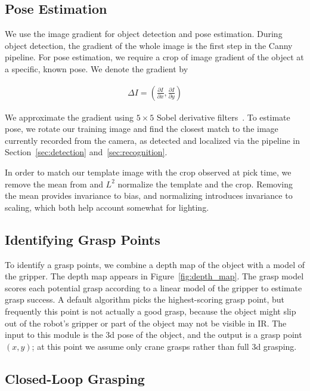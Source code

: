 \documentclass{article}
\begin{document}
 
\subsection{Pose Estimation}

We use the image gradient for object detection and pose estimation. During
object detection, the gradient of the whole image is the first step in the Canny pipeline.
For pose estimation,  we require a crop of  image gradient of the object
at a specific, known pose. We denote the gradient by

\begin{align}
\Delta I = \left( \frac{\partial I}{\partial x}, \frac{\partial I}{\partial y} \right)
\end{align}

We approximate the gradient using $5 \times 5$ Sobel derivative
filters~\citep{sobel95}.  To estimate pose, we rotate our training
image and find the closest match to the image currently recorded from
the camera, as detected and localized via the pipeline in
Section~\ref{sec:detection} and~\ref{sec:recognition}.

In order to match our template image with the crop observed at pick time,
we remove the mean from and $L^2$ normalize the template and the crop.
Removing the mean provides invariance to bias, and normalizing introduces
invariance to scaling, which both help account somewhat
for lighting. 

\subsection{Identifying Grasp Points}

To identify a grasp points, we combine a depth map of the object with
a model of the gripper.  The depth map appears in
Figure~\ref{fig:depth_map}.  The grasp model scores each potential
grasp according to a linear model of the gripper to estimate grasp
success. A default algorithm picks the highest-scoring grasp point,
but frequently this point is not actually a good grasp, because the
object might slip out of the robot's gripper or part of the object may
not be visible in IR.  The input to this module is the 3d pose of the
object, and the output is a grasp point $(x, y)$; at this point we
assume only crane grasps rather than full 3d grasping.



\subsection{Closed-Loop Grasping}
\end{document}
